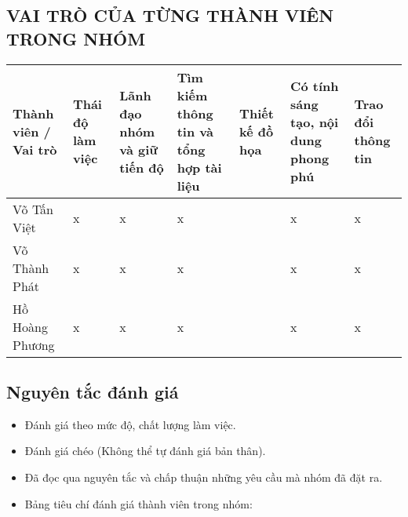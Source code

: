 \documentclass[a4paper,12pt]{article}
\begin{document}
    \subsection {VAI TRÒ CỦA TỪNG THÀNH VIÊN TRONG NHÓM}
    \begin{center}
    
    \begin{tabular} { | m{1.75cm} | m{1.75cm} | m{1.75cm} | m{1.75cm} | m{1.75cm} | m{1.75cm} | m{1.75cm} | }
    \hline
    Thành viên / Vai trò & Thái độ làm việc & Lãnh đạo nhóm và giữ tiến độ & Tìm kiếm thông tin và tổng hợp tài liệu & Thiết kế đồ họa & Có tính sáng tạo, nội dung phong phú & Trao đổi thông tin \\   
    \hline
    Võ Tấn Việt  & x & x & x &  & x & x \\
    \hline
    Võ Thành Phát  & x & x & x &  & x & x  \\
    \hline
    Hồ Hoàng Phương & x & x & x &  & x & x \\
    \hline
    \end{tabular}
    \end{center}
    
    \subsection {Nguyên tắc đánh giá}
    
    \begin{itemize}
        \item Đánh giá theo mức độ, chất lượng làm việc.
        \item Đánh giá chéo (Không thể tự đánh giá bản thân).
        \item Đã đọc qua nguyên tắc và chấp thuận những yêu cầu mà nhóm đã đặt ra.
        \item Bảng tiêu chí đánh giá thành viên trong nhóm:
    \end{itemize}
    
\end{document}
